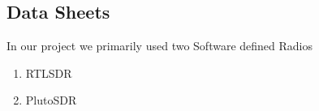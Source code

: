 \begin{appendices}
  \chapter{Data Sheets}
  In our project we primarily used two Software defined Radios
  \begin{enumerate}
      \item RTLSDR
      \item PlutoSDR
  \end{enumerate}



\end{appendices}
\pagebreak
